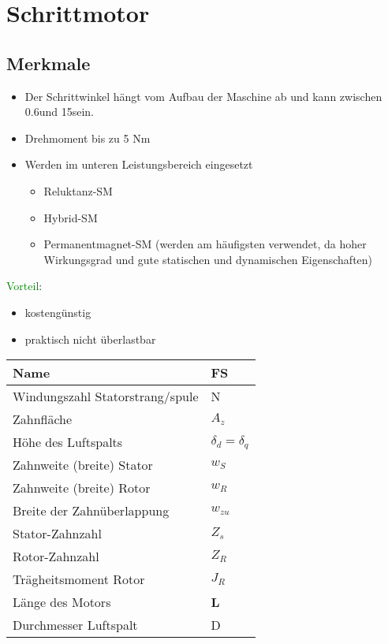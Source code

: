 \section{Schrittmotor}
\subsection{Merkmale}
    \begin{itemize}
        \item Der Schrittwinkel hängt vom Aufbau der Maschine ab und kann zwischen 0.6\textdegree  und 15\textdegree  sein.
        \item Drehmoment bis zu 5 Nm
        \item Werden im unteren Leistungsbereich eingesetzt
        \begin{itemize}
            \item Reluktanz-SM
            \item Hybrid-SM
            \item Permanentmagnet-SM (werden am häufigsten verwendet, da hoher Wirkungsgrad und gute statischen und dynamischen Eigenschaften)
        \end{itemize} 
    \end{itemize}
    \textcolor{green}{Vorteil}:
    \begin{itemize}
        \item kostengünstig
        \item praktisch nicht überlastbar
    \end{itemize}
    \renewcommand{\arraystretch}{2}
    \begin{tabularx}{0.43\linewidth}{|X|l|}
        \hline 
        \textbf{Name}&\textbf{FS} \\
        \hline
        Windungszahl Statorstrang/spule&N  \\ 
        \hline 
        Zahnfläche&$ A_z $  \\ 
        \hline
        Höhe des Luftspalts& $ \delta_{d} = \delta_{q}$ \\ 
        \hline 
        Zahnweite (breite) Stator& $ w_S $  \\ 
        \hline
        Zahnweite (breite) Rotor& $ w_R $ \\
        \hline 
        Breite der Zahnüberlappung&  $ w_{zu} $ \\ 
        \hline
        Stator-Zahnzahl& $  Z_s $\\
        \hline
        Rotor-Zahnzahl&$ Z_R $ \\
        \hline 
        Trägheitsmoment Rotor& $ J_R $ \\
        \hline
        Länge des Motors&\textbf{L} \\
        \hline
        Durchmesser Luftspalt&D\\
        \hline                                    
    \end{tabularx}
